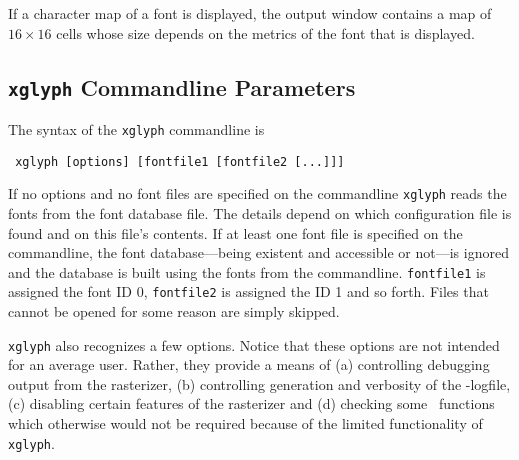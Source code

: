 If a character map of a font is displayed, the output window contains
a map of $16\times 16$ cells whose size depends on the metrics of the
font that is displayed.


\subsection{{\tt xglyph} Commandline Parameters}
The syntax of the \verb+xglyph+ commandline is 
\begin{verbatim}
 xglyph [options] [fontfile1 [fontfile2 [...]]]
\end{verbatim}
If no options and no font files are specified on the commandline \verb+xglyph+
reads the fonts from the font database file. The details depend on which
configuration file is found and on this file's contents. If at least one font
file is specified on the commandline, the font database---being existent and
accessible or not---is ignored and the database is built using the fonts from
the commandline. \verb+fontfile1+ is assigned the font ID 0, \verb+fontfile2+
is assigned the ID 1 and so forth. Files that cannot be opened for some reason
are simply skipped. 

\verb+xglyph+ also recognizes a few options. Notice that these options are not
intended for an average user. Rather, they provide a means of (a) controlling
debugging output from the rasterizer, (b) controlling generation and verbosity
of the \tonelib-logfile, (c) disabling certain features of the rasterizer and
(d) checking some \tonelib\ functions which otherwise would not be required
because of the limited functionality of \verb+xglyph+.

